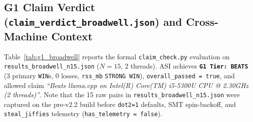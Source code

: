 \documentclass[11pt,a4paper]{article}
\begin{document}
\subsection{G1 Claim Verdict (\texttt{claim\_verdict\_broadwell.json}) and Cross-Machine Context}
Table~\ref{tab:g1_broadwell} reports the formal \texttt{claim\_check.py} evaluation on \texttt{results\_broadwell\_n15.json} ($N=15$, 2 threads). ASI achieves \textbf{\texttt{G1 Tier: BEATS}} (3 primary \texttt{WIN}s, 0 losses, \texttt{rss\_mb} \texttt{STRONG WIN}), \texttt{overall\_passed = true}, and allowed claim \emph{``Beats llama.cpp on Intel(R) Core(TM) i5-5300U CPU @ 2.30GHz (2 threads)''}. Note that the 15 raw pairs in \texttt{results\_broadwell\_n15.json} were captured on the pre-v2.2 build before \texttt{dot2=1} defaults, SMT spin-backoff, and \texttt{steal\_jiffies} telemetry (\texttt{has\_telemetry = false}).
\end{document}

